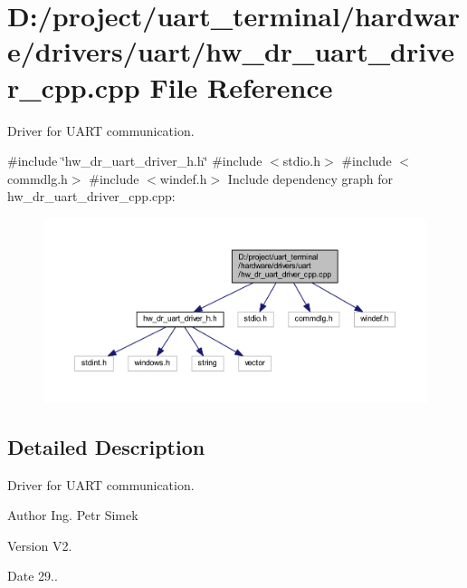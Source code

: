 \section{D\+:/project/uart\+\_\+terminal/hardware/drivers/uart/hw\+\_\+dr\+\_\+uart\+\_\+driver\+\_\+cpp.cpp File Reference}
\label{hw__dr__uart__driver__cpp_8cpp}


Driver for U\+A\+RT communication.  


{\ttfamily \#include \char`\"{}hw\+\_\+dr\+\_\+uart\+\_\+driver\+\_\+h.\+h\char`\"{}}\newline
{\ttfamily \#include $<$stdio.\+h$>$}\newline
{\ttfamily \#include $<$commdlg.\+h$>$}\newline
{\ttfamily \#include $<$windef.\+h$>$}\newline
Include dependency graph for hw\+\_\+dr\+\_\+uart\+\_\+driver\+\_\+cpp.\+cpp\+:
\nopagebreak
\begin{figure}[H]
\begin{center}
\leavevmode
\includegraphics[width=350pt]{hw__dr__uart__driver__cpp_8cpp__incl}
\end{center}
\end{figure}


\subsection{Detailed Description}
Driver for U\+A\+RT communication. 

\begin{DoxyAuthor}{Author}
Ing. Petr Simek 
\end{DoxyAuthor}
\begin{DoxyVersion}{Version}
V2. 
\end{DoxyVersion}
\begin{DoxyDate}{Date}
29.. 
\end{DoxyDate}
